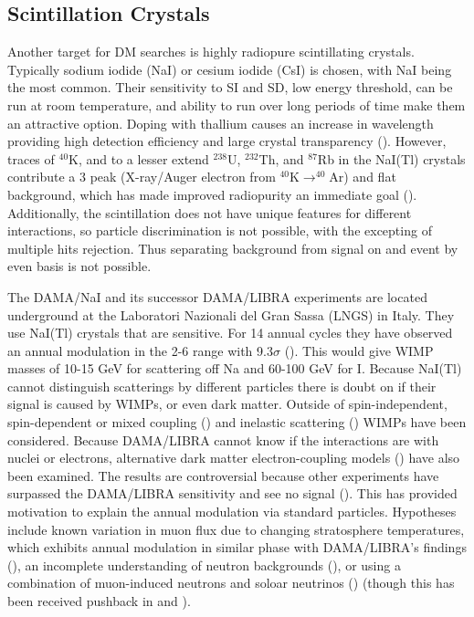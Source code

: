 
\subsection{Scintillation Crystals} \label{subsec:crystals}
Another target for DM searches is highly radiopure scintillating crystals.  Typically sodium iodide (NaI) or cesium iodide (CsI) is chosen,
with NaI being the most common.  Their sensitivity to SI and SD, low energy threshold, can be run at room temperature,
and ability to run over long periods of time
make them an attractive option.  Doping with thallium causes an increase in wavelength providing high detection efficiency and large
crystal transparency ().  However, traces of $^{40}$K, and to a lesser extend $^{238}$U, $^{232}$Th,
and $^{87}$Rb in the NaI(Tl) crystals contribute a 3 \kevee peak (X-ray/Auger electron from $^{40}\mathrm{K} \rightarrow ^{40}\mathrm{Ar}$)
and flat background, which has made improved radiopurity an immediate goal ().  Additionally, the scintillation
does not have unique features for different interactions, so particle discrimination is not possible, with the excepting of
multiple hits rejection.  Thus separating background from signal on and event by even basis is not possible.

The DAMA/NaI and its successor DAMA/LIBRA experiments are located underground at the Laboratori Nazionali del Gran Sassa (LNGS) in
Italy.  They use NaI(Tl) crystals that are sensitive.  For 14 annual cycles they have observed an annual modulation in the 2-6 \kevee
range with 9.3$\sigma$ ().  This would give WIMP masses of 10-15 GeV for scattering off Na
and 60-100 GeV for I.  Because NaI(Tl) cannot distinguish scatterings by different particles there is doubt on if their signal
is caused by WIMPs, or even dark matter.  Outside of spin-independent, spin-dependent or mixed coupling ()
and inelastic scattering () WIMPs 
have been considered.  Because DAMA/LIBRA cannot know if the interactions are with nuclei or electrons, alternative dark matter
electron-coupling models () have also been examined.  The results are controversial because other experiments
have surpassed the DAMA/LIBRA sensitivity and see no signal ().  This has provided motivation to explain the annual modulation via
standard particles.  Hypotheses include known variation in muon flux due to changing stratosphere temperatures, which exhibits
annual modulation in similar phase with DAMA/LIBRA's findings (), an incomplete understanding of neutron backgrounds
(), or using a combination of muon-induced neutrons and soloar neutrinos () (though this
has been received pushback in  and ).

